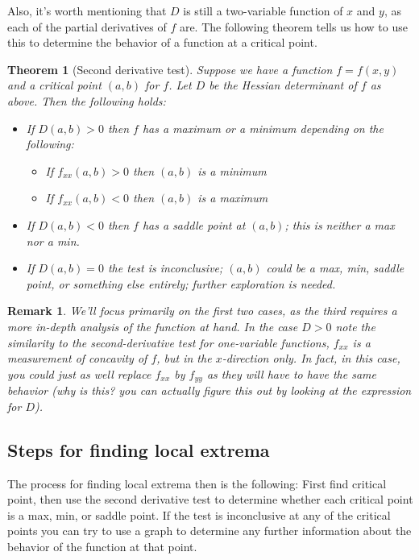 \documentclass[12pt]{article}
\numberwithin{equation}{subsection}
\numberwithin{figure}{subsection}
\newtheorem{thm}[subsection]{Theorem}
\theoremstyle{note}
\newtheorem{remark}[subsection]{Remark}
\begin{document}
{Also, it's worth mentioning that $D$ is still a two-variable function of $x$ and $y$, as each of the partial derivatives of $f$ are. The following theorem tells us how to use this to determine the behavior of a function at a critical point.



\begin{thm}[Second derivative test] Suppose we have a function $f=f(x,y)$ and a critical point $(a,b)$ for $f$. Let $D$ be the Hessian determinant of $f$ as above. Then the following holds:
\begin{itemize} 
	\item If $D(a,b)>0$ then $f$ has a maximum or a minimum depending on the following:
		\begin{itemize}
			\item If $f_{xx}(a,b)>0$ then $(a,b)$ is a \textit{minimum}
			\item If $f_{xx}(a,b)<0$ then $(a,b)$ is a \textit{maximum}
		\end{itemize}
	\item If $D(a,b)<0$ then $f$ has a saddle point at $(a,b)$; this is neither a max nor a min.
	\item If $D(a,b)=0$ the test is inconclusive; $(a,b)$ could be a max, min, saddle point, or something else entirely; further exploration is needed.
\end{itemize}
\end{thm}

\begin{remark}We'll focus primarily on the first two cases, as the third requires a more in-depth analysis of the function at hand. In the case $D>0$ note the similarity to the second-derivative test for one-variable functions, $f_{xx}$ is a measurement of concavity of $f$, but in the $x$-direction only. In fact, in this case, you could just as well replace $f_{xx}$ by $f_{yy}$ as they will have to have the same behavior (\textit{why is this? you can actually figure this out by looking at the expression for $D$}).\end{remark}

\subsection{Steps for finding local extrema}
The process for finding local extrema then is the following: First find critical point, then use the second derivative test to determine whether each critical point is a max, min, or saddle point. If the test is inconclusive at any of the critical points you can try to use a graph to determine any further information about the behavior of the function at that point.

}
\end{document}
